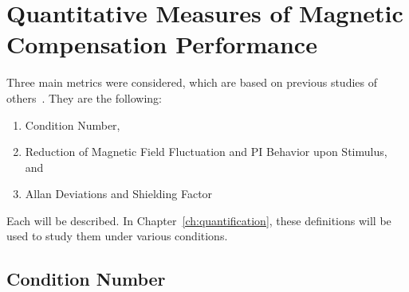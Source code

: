 

 
 
% 





\section{Quantitative Measures of Magnetic Compensation Performance\label{sec:metrics}}
Three main metrics were considered, which are based on previous studies of others~\cite{bea,lins,rawlik}. They are the following:

\begin{enumerate}
    \item Condition Number,
    \item Reduction of Magnetic Field Fluctuation and PI Behavior upon Stimulus, and
    \item Allan Deviations and Shielding Factor
\end{enumerate}

Each will be described. In Chapter~\ref{ch:quantification}, these definitions will be used to study them under various conditions.

\subsection{Condition Number}


